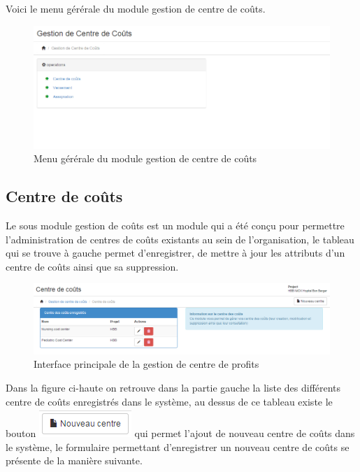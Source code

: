 \documentclass[12pt,a4paper]{report}
\begin{document}
Voici le menu gérérale du module gestion de centre de coûts.

\begin{figure}[h]
\begin{center}
\includegraphics[width=14cm]{pic/GestCentreCout.png}
\end{center}
\caption{Menu gérérale du module gestion de centre de coûts}
\label{Menu gérérale du module gestion de centre de coûts}
\end{figure}

\subsection{Centre de coûts}
Le sous module gestion de coûts est un module qui a été conçu pour permettre l'administration de centres de coûts existants au sein de l'organisation, le tableau qui se trouve à gauche permet d’enregistrer, de mettre à jour les attributs d'un centre de coûts ainsi que sa suppression.
\begin{figure}[h]
\begin{center}
\includegraphics[width=14cm]{pic/CostCenter.png}
\end{center}
\caption{Interface principale de la gestion de centre de profits}
\label{Interface principale de la gestion de centre de profits}
\end{figure}

Dans la figure ci-haute on retrouve dans la partie gauche la liste des différents centre de coûts enregistrés dans le système, au dessus de ce tableau existe le bouton \includegraphics[scale=1]{pic/NewCostCenter.png} qui permet l'ajout de nouveau centre de coûts dans le système, le formulaire permettant d'enregistrer un nouveau centre de coûts se présente de la manière suivante.
\end{document}

